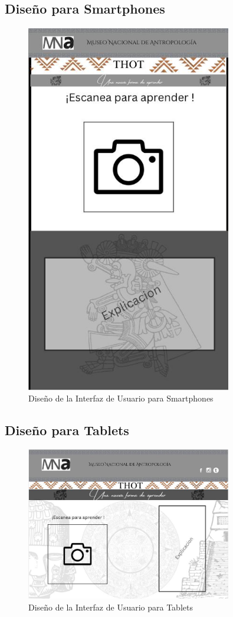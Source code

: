 \documentclass{report}
\begin{document}
\subsection{Diseño para Smartphones}
\begin{figure}[H]
    \centering
    \includegraphics[width=0.8\textwidth]{interfazSP.jpeg}
    \caption{Diseño de la Interfaz de Usuario para Smartphones}
\end{figure}
\subsection{Diseño para Tablets}
\begin{figure}[H]
    \centering
    \includegraphics[width=0.8\textwidth]{interfazTablets.jpeg}
    \caption{Diseño de la Interfaz de Usuario para Tablets}
\end{figure}
\end{document}
